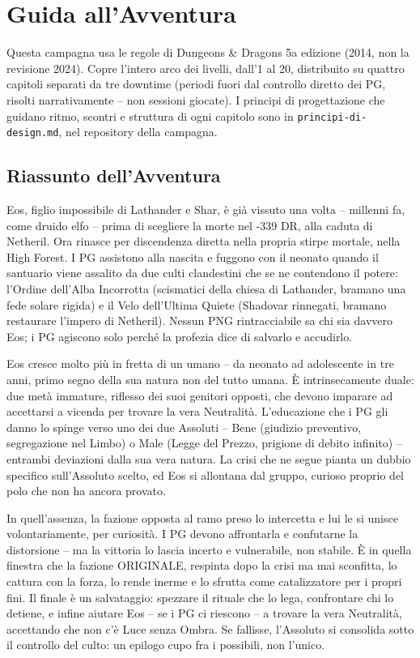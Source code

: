 \section{Guida all'Avventura}

Questa campagna usa le regole di Dungeons \& Dragons 5a edizione (2014, non la revisione 2024). Copre l'intero arco dei livelli, dall'1 al 20, distribuito su quattro capitoli separati da tre downtime (periodi fuori dal controllo diretto dei PG, risolti narrativamente -- non sessioni giocate). I principi di progettazione che guidano ritmo, scontri e struttura di ogni capitolo sono in \texttt{principi-di-design.md}, nel repository della campagna.

\subsection{Riassunto dell'Avventura}

Eos, figlio impossibile di Lathander e Shar, è già vissuto una volta -- millenni fa, come druido elfo -- prima di scegliere la morte nel -339 DR, alla caduta di Netheril. Ora rinasce per discendenza diretta nella propria stirpe mortale, nella High Forest. I PG assistono alla nascita e fuggono con il neonato quando il santuario viene assalito da due culti clandestini che se ne contendono il potere: l'Ordine dell'Alba Incorrotta (scismatici della chiesa di Lathander, bramano una fede solare rigida) e il Velo dell'Ultima Quiete (Shadovar rinnegati, bramano restaurare l'impero di Netheril). Nessun PNG rintracciabile sa chi sia davvero Eos; i PG agiscono solo perché la profezia dice di salvarlo e accudirlo.

Eos cresce molto più in fretta di un umano -- da neonato ad adolescente in tre anni, primo segno della sua natura non del tutto umana. È intrinsecamente duale: due metà immature, riflesso dei suoi genitori opposti, che devono imparare ad accettarsi a vicenda per trovare la vera Neutralità. L'educazione che i PG gli danno lo spinge verso uno dei due Assoluti -- Bene (giudizio preventivo, segregazione nel Limbo) o Male (Legge del Prezzo, prigione di debito infinito) -- entrambi deviazioni dalla sua vera natura. La crisi che ne segue pianta un dubbio specifico sull'Assoluto scelto, ed Eos si allontana dal gruppo, curioso proprio del polo che non ha ancora provato.

In quell'assenza, la fazione opposta al ramo preso lo intercetta e lui le si unisce volontariamente, per curiosità. I PG devono affrontarla e confutarne la distorsione -- ma la vittoria lo lascia incerto e vulnerabile, non stabile. È in quella finestra che la fazione ORIGINALE, respinta dopo la crisi ma mai sconfitta, lo cattura con la forza, lo rende inerme e lo sfrutta come catalizzatore per i propri fini. Il finale è un salvataggio: spezzare il rituale che lo lega, confrontare chi lo detiene, e infine aiutare Eos -- se i PG ci riescono -- a trovare la vera Neutralità, accettando che non c'è Luce senza Ombra. Se fallisse, l'Assoluto si consolida sotto il controllo del culto: un epilogo cupo fra i possibili, non l'unico.

